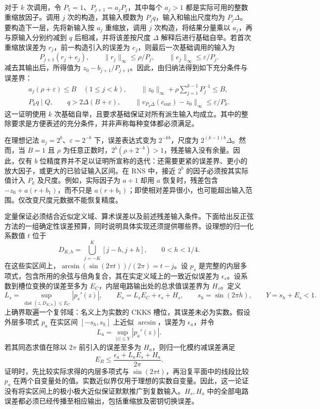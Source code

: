 对于 $k$ 次调用，令 $P_1=1$、$P_{j+1}=a_jP_j$，其中每个 $a_j>1$ 都是实际可用的整数重缩放因子。调用 $j$ 次的构造，其输入模数为 $P_jq$，输入和输出尺度均为 $P_j\Delta$。要构造下一层，先将新输入按 $a_j$ 重缩放，调用 $j$ 次构造，将结果分量乘以 $a_j$，再与原输入分别约减到 $q$ 后相减，并将该差按尺度 $\Delta$ 解释后进行基础自举。若首次重缩放误差为 $r_j$，前一构造引入的误差为 $e_j$，则最后一次基础调用的输入为
\[
P_{j+1}(r_j+e_j),\qquad
\|r_j\|_\infty\leq\rho/P_j,\qquad
\|e_j\|_\infty\leq\varepsilon/P_j.
\]
减去其输出后，所得值为 $z_0-b_{j+1}/P_{j+1}$。因此，由归纳法得到如下充分条件与误差界：
\begin{gather*}
a_j(\rho+\varepsilon)\leq B\quad(1\leq j<k),\qquad
\|z_0\|_\infty+\rho\sum_{j=1}^{k-1}P_j^{-1}\leq B,\\
P_kq\mid Q,\qquad q>2\Delta(B+\varepsilon),\qquad
\|v_{P_k\Delta}(c_{\mathrm{out}})-z_0\|_\infty\leq\varepsilon/P_k.
\end{gather*}
这一证明使用 $k$ 次基础自举，且要求基础保证对所有派生输入均成立。其中的整除要求是方便表述的充分条件，并非声称每种变体都必须满足。

在理想记法 $a_j=2^b$、$\varepsilon=2^{-b}$ 下，误差表达式变为 $2^{-kb}$，尺度为 $2^{(k-1)b}\Delta$。然而，当 $B=1$ 且 $\rho$ 为任意正数时，$2^b(\rho+2^{-b})>1$，残差输入没有余量。因此，仅有 $b$ 位精度界并不足以证明所宣称的迭代：还需要更紧的误差界、更小的放大因子，或更大的已验证输入区间。在 RNS 中，接近 $2^b$ 的因子必须按其实际值计入 $P_k$ 及尺度。例如，实际因子为 $a+1$ 却用 $a$ 恢复时，残差包含 $-z_0+a(r+b_1)$，而不只是 $a(r+b_1)$；即使相对差异很小，也可能超出输入范围。仅改变尺度元数据不能恢复精度。

 定量保证必须结合近似定义域、算术误差以及前述残差输入条件。下面给出反正弦方法的一组确定性误差预算，同时说明具体实现还须提供哪些界。设理想的归一化系数值 $t$ 位于
\[
D_{K,h}=\bigcup_{j=-K}^{K}[j-h,j+h],\qquad 0<h<1/4.
\]
在这些实区间上，$\arcsin(\sin(2\pi t))/(2\pi)=t-j$。设 $p_s$ 是完整的内层多项式，包含所用的余弦与倍角复合，其在实定义域上的一致近似误差为 $\epsilon_s$。设系数到槽位变换的误差至多为 $E_C$，内层电路输出处的总求值误差界为 $H_s$。定义
\[
L_s=\sup_{\operatorname{dist}(z,D_{K,h})\leq E_C}|p_s'(z)|,
\qquad E_s=L_sE_C+\epsilon_s+H_s,
\qquad s_h=\sin(2\pi h),\qquad Y=s_h+E_s<1.
\]
上确界取遍一个复邻域：名义上为实数的 CKKS 槽位，其误差未必为实数。假设外层多项式 $p_a$ 在实区间 $[-s_h,s_h]$ 上近似 $\arcsin$，误差为 $\epsilon_a$，并令
\[
L_a=\sup_{|z|\leq Y}|p_a'(z)|.
\]
若其同态求值在除以 $2\pi$ 前引入的误差至多为 $H_a$，则归一化模约减误差满足
\[
E_R\leq\frac{\epsilon_a+L_aE_s+H_a}{2\pi}.
\]
证明时，先比较实际求得的内层多项式与 $\sin(2\pi t)$，再沿复平面中的线段比较 $p_a$ 在两个自变量处的值。实数近似界仅用于理想的实数自变量。因此，这一论证没有将实区间上的极小极大近似保证默默推广到复数输入。$H_s,H_a$ 中的全部电路误差都必须已经传播至相应输出，包括重缩放及密钥切换误差。

